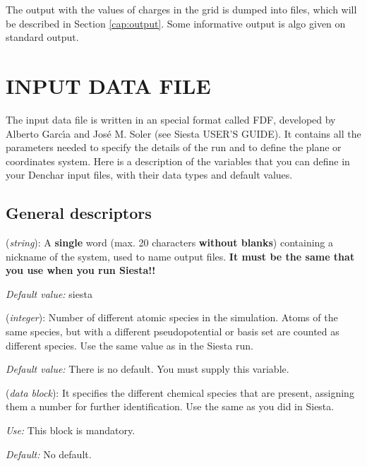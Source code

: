  The output with the values of charges 
 in the grid is dumped into files, which will be described
 in Section \ref{cap:output}. Some informative output is
 algo given on standard output.

\section{INPUT DATA FILE}
\label{cap:input} 

The input data file is written in an special format called FDF, developed
by Alberto Garc\'{\i}a and Jos\'e M. Soler (see {\sc Siesta} USER'S GUIDE).
It contains all the parameters needed to specify the details
of the run and to define the plane or coordinates system.
Here is a description of the variables that you can define in your 
{\sc Denchar} input files,
with their data types and default values.

\vspace{5pt}
\subsection{General descriptors}

\begin{description}
\itemsep 10pt
\parsep 0pt

\item[{\bf SystemLabel}] ({\it string}): 
A {\bf single} word (max. 20 characters {\bf without blanks})
containing a nickname of the system, used to name output files. 
{\bf It must be the same that you use when you run {\sc Siesta}!!}

{\it Default value:} siesta

\item[{\bf NumberOfSpecies}] ({\it integer}):
Number of different atomic species in the simulation.
Atoms of the same species, but with a different
pseudopotential or basis set are counted as different species.
Use the same value as in the {\sc Siesta} run.

{\it Default value:} There is no default. You must supply this variable.


\item[{\bf ChemicalSpeciesLabel}] ({\it data block}):
It specifies the different chemical species that are present,
assigning them a number for further identification.
Use the same as you did in {\sc Siesta}.

{\it Use:} This block is mandatory.

{\it Default:} No default.
\end{description}


